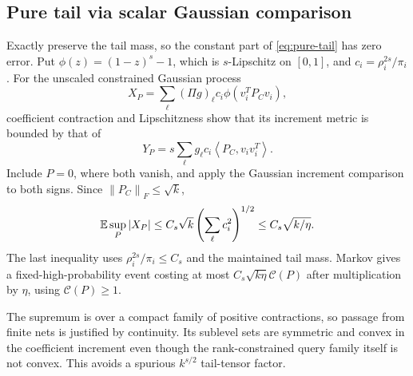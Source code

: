 \documentclass[11pt]{article}
\theoremstyle{remark}\newtheorem{remark}[theorem]{Remark}
\newcommand{\norm}[1]{\left\|#1\right\|}\newcommand{\ip}[2]{\left\langle #1,#2\right\rangle}
\newcommand{\cost}{\mathcal C}\newcommand{\OPT}{\mathsf{OPT}}
\begin{document}
\subsection{Pure tail via scalar Gaussian comparison}\label{sub:tail}
Exactly preserve the tail mass, so the constant part of \eqref{eq:pure-tail} has zero error. Put $\phi(z)=(1-z)^s-1$, which is $s$-Lipschitz on $[0,1]$, and $c_i=\rho_i^{2s}/\pi_i$. For the unscaled constrained Gaussian process
\[
 X_P=\sum_\ell(\Pi g)_\ell c_i\phi(v_i^TP_Cv_i),
\]
coefficient contraction and Lipschitzness show that its increment metric is bounded by that of
\[
 Y_P=s\sum_\ell g_\ell c_i\ip{P_C}{v_iv_i^T}.
\]
Include $P=0$, where both vanish, and apply the Gaussian increment comparison to both signs. Since $\norm{P_C}_F\le\sqrt{k}$,
\[
 \mathbb E\sup_P|X_P|\le C_s\sqrt{k}\left(\sum_\ell c_i^2\right)^{1/2}
 \le C_s\sqrt{k/\eta}.
\]
The last inequality uses $\rho_i^{2s}/\pi_i\le C_s$ and the maintained tail mass. Markov gives a fixed-high-probability event costing at most $C_s\sqrt{k\eta}\cost(P)$ after multiplication by $\eta$, using $\cost(P)\ge1$.

The supremum is over a compact family of positive contractions, so passage from finite nets is justified by continuity. Its sublevel sets are symmetric and convex in the coefficient increment even though the rank-constrained query family itself is not convex. This avoids a spurious $k^{s/2}$ tail-tensor factor.
\end{document}
